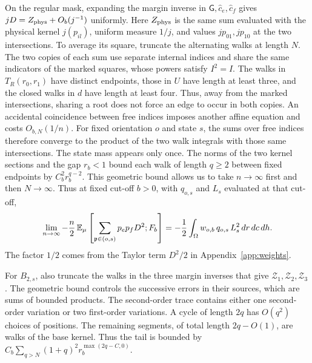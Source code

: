 On the regular mask, expanding the margin inverse in \(\mathsf G,\hat c_e,\hat c_f\) gives \(jD=Z_{\rm
phys}+O_b(j^{-1})\) uniformly. Here \(Z_{\rm phys}\) is the same sum evaluated with the physical kernel
\(j(p_{il})\), uniform measure \(1/j\), and values \(jp_{01},jp_{10}\) at the two intersections. To
average its square, truncate the alternating walks at length \(N\). The two copies of each sum use
separate internal indices and share the same indicators of the marked squares, whose powers satisfy
\(I^2=I\). The walks in \(T_R(r_0,r_1)\) have distinct endpoints, those in \(U\) have length at least
three, and the closed walks in \(d\) have length at least four. Thus, away from the marked intersections,
sharing a root does not force an edge to occur in both copies. An accidental coincidence between free
indices imposes another affine equation and costs \(O_{b,N}(1/n)\). For fixed orientation \(o\) and state
\(s\), the sums over free indices therefore converge to the product of the two walk integrals with those
same intersections. The state mass appears only once. The norms of the two kernel sections and the gap
\(r_b<1\) bound each walk of length \(q\ge2\) between fixed endpoints by \(C_b^2r_b^{q-2}\). This
geometric bound allows us to take \(n\to\infty\) first and then \(N\to\infty\). Thus at fixed cut-off
\(b>0\), with \(q_{o,s}\) and \(L_s\) evaluated at that cut-off, \[
 \lim_{n\to\infty}-\frac n2\,\mathbb E_\mu
 \left[\sum_{\mathfrak p\in(o,s)}p_ep_fD^2;F_b\right]
 =-\frac12\int_\Omega w_{o,b}\,q_{o,s}\,L_s^2\,dr\,dc\,dh .
\] The factor \(1/2\) comes from the Taylor term \(D^2/2\) in Appendix~\ref{app:weights}.

For \(B_{2,s}\), also truncate the walks in the three margin inverses that give \(\mathcal Z_1,\mathcal
Z_2,\mathcal Z_3\). The geometric bound controls the successive errors in their sources, which are sums
of bounded products. The second-order trace contains either one second-order variation or two first-order
variations. A cycle of length \(2q\) has \(O(q^2)\) choices of positions. The remaining segments, of
total length \(2q-O(1)\), are walks of the base kernel. Thus the tail is bounded by
\(C_b\sum_{q>N}(1+q)^2r_b^{\max(2q-C,0)}\).

